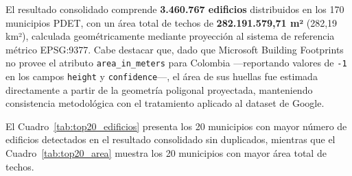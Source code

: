 \documentclass{article}
\begin{document}
El resultado consolidado comprende \textbf{3.460.767 edificios} distribuidos en los 
170 municipios PDET, con un área total de techos de \textbf{282.191.579,71 m²} 
(282,19 km²), calculada geométricamente mediante proyección al sistema de referencia 
métrico EPSG:9377. Cabe destacar que, dado que Microsoft Building Footprints no 
provee el atributo \texttt{area\_in\_meters} para Colombia —reportando valores de 
\texttt{-1} en los campos \texttt{height} y \texttt{confidence}—, el área de sus 
huellas fue estimada directamente a partir de la geometría poligonal proyectada, 
manteniendo consistencia metodológica con el tratamiento aplicado al dataset de Google.

El Cuadro~\ref{tab:top20_edificios} presenta los 20 municipios con mayor número de 
edificios detectados en el resultado consolidado sin duplicados, mientras que el 
Cuadro~\ref{tab:top20_area} muestra los 20 municipios con mayor área total de techos.
\end{document}
